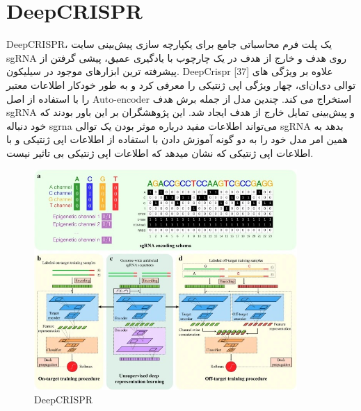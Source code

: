 \documentclass[12pt,a4paper,BCOR=.7cm,headsepline,bibliography=totoc]{report}
\begin{document}
\section{DeepCRISPR~\cite{DeepCRISPR}}
DeepCRISPR، 
یک پلت فرم محاسباتی جامع برای یکپارچه سازی پیش‌بینی سایت sgRNA روی هدف و خارج از هدف در یک چارچوب با یادگیری عمیق، پیشی گرفتن از پیشرفته ترین ابزارهای موجود در سیلیکون. DeepCrispr [37] علاوه بر ویژگی های توالی دی‌ان‌ای، چهار ویژگی اپی ژنتیکی را معرفی کرد و به طور خودکار اطلاعات معتبر را با استفاده از اصل Auto-encoder استخراج می کند. چندین مدل از جمله برش هدف sgRNA و پیش‌بینی تمایل خارج از هدف ایجاد شد. این پژوهشگران بر این باور بودند که خود دنباله sgrna می‌تواند اطلاعات مفید درباره موثر بودن یک توالی sgRNA بدهد به همین امر مدل خود را به دو گونه آموزش دادن با استفاده از اطلاعات اپی ژنتیکی و با اطلاعات اپی ژنتیکی که نشان میدهد که اطلاعات اپی ژنتیکی بی تاثیر نیست. 
\begin{figure}[H]
\centering
\includegraphics[width=10cm, ]{pictures/DeepCRISPR.jpg}
\caption{
DeepCRISPR
}\label{wrap-fig:4}
\end{figure}
\end{document}
